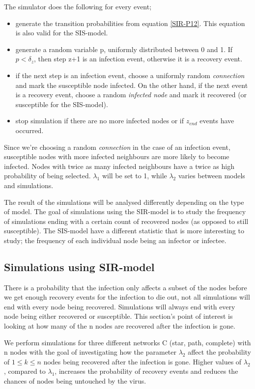\documentclass[12pt]{article} %
\numberwithin{equation}{section}
\begin{document}
The simulator does the following for every event; 
\begin{itemize}
    \item generate the transition probabilities from equation \ref{SIR-P12}. This equation is also valid for the SIS-model.
    \item generate a random variable p, uniformly distributed between 0 and 1. If $p<\delta_z$, then step z+1 is an infection event, otherwise it is a recovery event.
    \item if the next step is an infection event, choose a uniformly random \textit{connection} and mark the susceptible node infected. On the other hand, if the next event is a recovery event, choose a random \textit{infected node} and mark it recovered (or susceptible for the SIS-model).
    \item stop simulation if there are no more infected nodes or if $z_{end}$ events have occurred.
\end{itemize}

Since we're choosing a random \textit{connection} in the case of an infection event, susceptible nodes with more infected neighbours are more likely to become infected. Nodes with twice as many infected neighbours have a twice as high probability of being selected. $\lambda_1$ will be set to 1, while $\lambda_2$ varies between models and simulations. 

The result of the simulations will be analysed differently depending on the type of model. The goal of simulations using the SIR-model is to study the frequency of simulations ending with a certain count of recovered nodes (as opposed to still susceptible). The SIS-model have a different statistic that is more interesting to study; the frequency of each individual node being an infector or infectee.



\subsection{Simulations using SIR-model}\label{SIRsimsection}
There is a probability that the infection only affects a subset of the nodes before we get enough recovery events for the infection to die out, not all simulations will end with every node being recovered. Simulations will always end with every node being either recovered or susceptible. This section's point of interest is looking at how many of the n nodes are recovered after the infection is gone.

We perform simulations for three different networks C (star, path, complete) with n nodes with the goal of investigating how the parameter $\lambda_2$ affect the probability of $1\leq k\leq n$ nodes being recovered after the infection is gone. Higher values of $\lambda_2$, compared to $\lambda_1$, increases the probability of recovery events and reduces the chances of nodes being untouched by the virus. 
\end{document}

